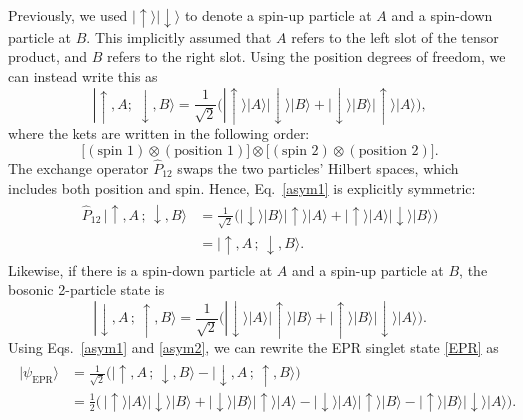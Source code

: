 \documentclass[prx,12pt]{revtex4-2}
\begin{document}
Previously, we used $|\!\uparrow\rangle |\!\downarrow\rangle$ to
denote a spin-up particle at $A$ and a spin-down particle at $B$.
This implicitly assumed that $A$ refers to the left slot of the tensor
product, and $B$ refers to the right slot.  Using the position degrees
of freedom, we can instead write this as
\begin{equation}
  |\uparrow, A;\; \downarrow, B\rangle = \frac{1}{\sqrt{2}}
  \Big(|\!\uparrow\rangle|A\rangle |\!\downarrow\rangle|B\rangle
  + |\!\downarrow\rangle|B\rangle |\!\uparrow\rangle|A\rangle \Big),
  \label{asym1}
\end{equation}
where the kets are written in the following order:
\begin{equation}
  \Big[
    (\textrm{spin 1}) \otimes (\textrm{position 1}) \Big]
  \otimes
  \Big[
    (\textrm{spin 2}) \otimes (\textrm{position 2}) \Big].
  \label{order1}
\end{equation}
The exchange operator $\hat{P}_{12}$ swaps the two particles' Hilbert
spaces, which includes both position and spin.  Hence,
Eq.~\eqref{asym1} is explicitly symmetric:
\begin{align}
  \begin{aligned}
  \hat{P}_{12} \, |\uparrow, A\,;\, \downarrow, B\rangle &= \frac{1}{\sqrt{2}}
  \Big(|\!\downarrow\rangle|B\rangle |\!\uparrow\rangle|A\rangle
  + |\!\uparrow\rangle|A\rangle |\!\downarrow\rangle|B\rangle \Big) \\
  &= |\uparrow, A\,;\, \downarrow, B\rangle.
  \end{aligned}
\end{align}
Likewise, if there is a spin-down particle at $A$ and a spin-up
particle at $B$, the bosonic 2-particle state is
\begin{equation}
  |\downarrow, A\,;\, \uparrow, B\rangle = \frac{1}{\sqrt{2}}
  \Big(|\!\downarrow\rangle|A\rangle |\!\uparrow\rangle|B\rangle
  + |\!\uparrow\rangle|B\rangle |\!\downarrow\rangle|A\rangle \Big).
  \label{asym2}
\end{equation}
Using Eqs.~\eqref{asym1} and \eqref{asym2}, we can rewrite the EPR
singlet state \eqref{EPR} as
\begin{align}
  \begin{aligned}
    |\psi_{\mathrm{EPR}}\rangle &= \frac{1}{\sqrt{2}} \Big(
    |\!\uparrow, A\,;\, \downarrow, B\rangle - |\downarrow, A\,;\, \uparrow, B\rangle \Big)\\
    &= \frac{1}{2} \Big(\,
    |\!\uparrow\rangle|A\rangle |\!\downarrow\rangle|B\rangle
    + |\!\downarrow\rangle|B\rangle |\!\uparrow\rangle|A\rangle
    - |\!\downarrow\rangle|A\rangle |\!\uparrow\rangle|B\rangle
    - |\!\uparrow\rangle|B\rangle |\!\downarrow\rangle|A\rangle \Big).
    \label{epr1}
  \end{aligned}
\end{align}
\end{document}
